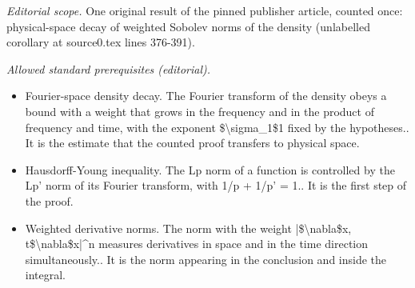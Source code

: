 \documentclass[10pt,a4paper]{article}
\theoremstyle{plain}
\theoremstyle{remark}
\begin{document}
\noindent\textit{Editorial scope.} One original result of the pinned publisher article, counted once: physical-space decay of weighted Sobolev norms of the density (unlabelled corollary at source0.tex lines 376-391).\par\medskip
\noindent\textit{Allowed standard prerequisites (editorial).}\begin{itemize}
\item Fourier-space density decay. The Fourier transform of the density obeys a bound with a weight that grows in the frequency and in the product of frequency and time, with the exponent \$\textbackslash{}sigma\_1\$1 fixed by the hypotheses.. It is the estimate that the counted proof transfers to physical space.
\item Hausdorff-Young inequality. The Lp norm of a function is controlled by the Lp' norm of its Fourier transform, with 1/p + 1/p' = 1.. It is the first step of the proof.
\item Weighted derivative norms. The norm with the weight |\$\textbackslash{}nabla\$x, t\$\textbackslash{}nabla\$x|\textasciicircum{}n measures derivatives in space and in the time direction simultaneously.. It is the norm appearing in the conclusion and inside the integral.
\end{itemize}\medskip
\end{document}
